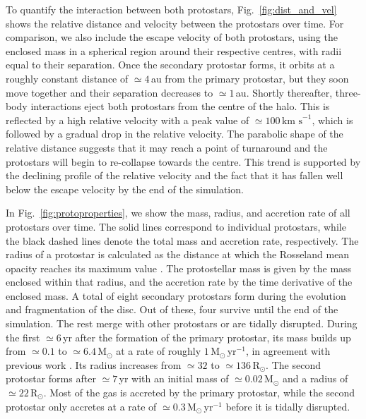 \documentclass[useAMS,usenatbib]{mnras}
\newcommand{\kms}{\text{km~s}^{-1}}
\newcommand{\msunyr}{\text{M}_\odot\,\text{yr}^{-1}}
\newcommand{\msun}{\text{M}_\odot}
\newcommand{\rsun}{\text{R}_\odot}
\begin{document}
To quantify the interaction between both protostars, Fig.~\ref{fig:dist_and_vel} shows the relative distance and velocity between the protostars over time. For comparison, we also include the escape velocity of both protostars, using the enclosed mass in a spherical region around their respective centres, with radii equal to their separation. Once the secondary protostar forms, it orbits at a roughly constant distance of $\simeq 4\,$au from the primary protostar, but they soon move together and their separation decreases to $\simeq 1\,$au. Shortly thereafter, three-body interactions eject both protostars from the centre of the halo. This is reflected by a high relative velocity with a peak value of $\simeq 100\,\kms$, which is followed by a gradual drop in the relative velocity. The parabolic shape of the relative distance suggests that it may reach a point of turnaround and the protostars will begin to re-collapse towards the centre. This trend is supported by the declining profile of the relative velocity and the fact that it has fallen well below the escape velocity by the end of the simulation.

In Fig.~\ref{fig:protoproperties}, we show the mass, radius, and accretion rate of all protostars over time. The solid lines correspond to individual protostars, while the black dashed lines denote the total mass and accretion rate, respectively. The radius of a protostar is calculated as the distance at which the Rosseland mean opacity reaches its maximum value \citep{Stacy_2013}. The protostellar mass is given by the mass enclosed within that radius, and the accretion rate by the time derivative of the enclosed mass. A total of eight secondary protostars form during the evolution and fragmentation of the disc. Out of these, four survive until the end of the simulation. The rest merge with other protostars or are tidally disrupted. During the first $\simeq 6\,$yr after the formation of the primary protostar, its mass builds up from $\simeq 0.1$ to $\simeq 6.4\,\msun$ at a rate of roughly $1\,\msunyr$, in agreement with previous work \citep{Latif_2013a, Inayoshi_2014}. Its radius increases from $\simeq 32$ to $\simeq 136\,\rsun$. The second protostar forms after $\simeq 7\,$yr with an initial mass of $\simeq 0.02\,\msun$ and a radius of $\simeq 22\,\rsun$. Most of the gas is accreted by the primary protostar, while the second protostar only accretes at a rate of $\simeq 0.3\,\msunyr$ before it is tidally disrupted.
\end{document}
